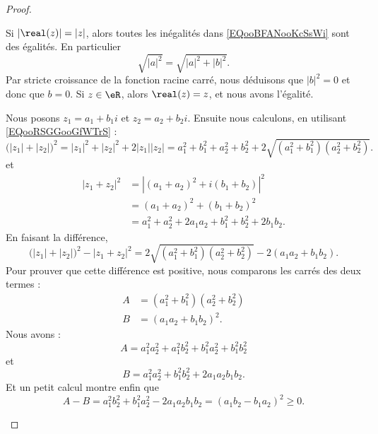 \begin{proof}
\begin{subproof}
\begin{subproof}
			Si \( | \real(z) |=| z |\), alors toutes les inégalités dans \eqref{EQooBFANooKcSsWi} sont des égalités. En particulier
			\begin{equation}
				\sqrt{ | a |^2 }=\sqrt{ | a |^2+| b |^2 }.
			\end{equation}
			Par stricte croissance de la fonction racine carré, nous déduisons que \( | b |^2=0\) et donc que \( b=0\).
			Si \( z\in \eR\), alors \( \real(z)=z\), et nous avons l'égalité.
		\end{subproof}
		Nous posons \( z_1=a_1+b_1i\) et \( z_2=a_2+b_2i\). Ensuite nous calculons, en utilisant \eqref{EQooRSGGooGfWTrS} :
		\begin{equation}
			\big( | z_1 |+| z_2 | \big)^2=| z_1 |^2+| z_2 |^2+2| z_1 | |z_2 |=a_1^2+b_1^2+a_2^2+b_2^2+2\sqrt{ (a_1^2+b_1^2)(a_2^2+b_2^2) }.
		\end{equation}
		et
		\begin{subequations}
			\begin{align}
				| z_1+z_2 |^2 & =| (a_1+a_2)^2+i(b_1+b_2) |^2             \\
				              & =(a_1+a_2)^2+(b_1+b_2)^2                  \\
				              & =a_1^2+a_2^2+2a_1a_2+b_1^2+b_2^2+2b_1b_2.
			\end{align}
		\end{subequations}
		En faisant la différence,
		\begin{equation}
			\big( | z_1 |+|z_2| \big)^2-| z_1+z_2 |^2=2\sqrt{ (a_1^2+b_1^2)(a_2^2+b_2^2) }-2(a_1a_2+b_1b_2).
		\end{equation}
		Pour prouver que cette différence est positive, nous comparons les carrés des deux termes :
		\begin{subequations}
			\begin{align}
				A & =(a_1^2+b_1^2)(a_2^2+b_2^2) \\
				B & =(a_1a_2+b_1b_2)^2.
			\end{align}
		\end{subequations}
		Nous avons :
		\begin{equation}
			A=a_1^2a_2^2+a_1^2b_2^2+b_1^2a_2^2+b_1^2b_2^2
		\end{equation}
		et
		\begin{equation}
			B=a_1^2a_2^2+b_1^2b_2^2+2a_1a_2b_1b_2.
		\end{equation}
		Et un petit calcul montre enfin que
		\begin{equation}
			A-B=a_1^2b_2^2+b_1^2a_2^2-2a_1a_2b_1b_2=(a_1b_2-b_1a_2)^2\geq 0.
		\end{equation}
	\end{subproof}
\end{proof}



